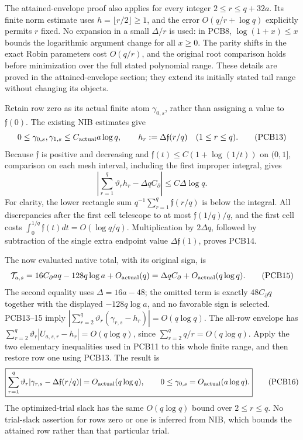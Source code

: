 The attained-envelope proof also applies for every integer
$2\le r\le q+32a$. Its finite norm estimate uses
$h=\lfloor r/2\rfloor\ge1$, and the error $O(q/r+\log q)$ explicitly
permits $r$ fixed. No expansion in a small $\Delta/r$ is used: in PCB8,
$\log(1+x)\le x$ bounds the logarithmic argument change for all $x\ge0$.
The parity shifts in the exact Robin parameters cost $O(q/r)$, and the
original root comparison holds before minimization over the full stated
polynomial range. These details are proved in the attained-envelope
section; they extend its initially stated tail range without changing its
objects.

Retain row zero as its actual finite atom $\gamma_{0,s}$, rather than
assigning a value to $\mathfrak f(0)$. The existing NIB estimates give
\[
 0\le\gamma_{0,s},\gamma_{1,s}
       \le C_{\rm actual}a\log q,
 \qquad h_r:=\Delta\mathfrak f(r/q)\quad(1\le r\le q).
 \tag{PCB13}
\]
Because $\mathfrak f$ is positive and decreasing and
$\mathfrak f(t)\le C(1+\log(1/t))$ on $(0,1]$, comparison on each mesh
interval, including the first improper integral, gives
\[
 \left|\sum_{r=1}^{q}\vartheta_rh_r-\Delta qC_\partial\right|
       \le C\Delta\log q.
 \tag{PCB14}
\]
For clarity, the lower rectangle sum $q^{-1}\sum_{r=1}^q\mathfrak f(r/q)$
is below the integral. All discrepancies after the first cell telescope
to at most $\mathfrak f(1/q)/q$, and the first cell costs
$\int_0^{1/q}\mathfrak f(t)dt=O(\log q/q)$.
Multiplication by $2\Delta q$, followed by subtraction of the single
extra endpoint value $\Delta\mathfrak f(1)$, proves PCB14.

The now evaluated native total, with its original sign, is
\[
 \mathcal T_{a,s}=16C_\partial aq-128q\log a+O_{\rm actual}(q)
       =\Delta qC_\partial+O_{\rm actual}(q\log q).
 \tag{PCB15}
\]
The second equality uses $\Delta=16a-48$; the omitted term is exactly
$48C_\partial q$ together with the displayed $-128q\log a$, and no
favorable sign is selected. PCB13--15 imply
$|\sum_{r=2}^q\vartheta_r(\gamma_{r,s}-h_r)|=O(q\log q)$.
The all-row envelope has
$\sum_{r=2}^q\vartheta_r|U_{a,s,r}-h_r|=O(q\log q)$, since
$\sum_{r=2}^q q/r=O(q\log q)$.
Apply the two elementary inequalities used in PCB11 to this whole finite
range, and then restore row one using PCB13. The result is
\[
 \boxed{\sum_{r=1}^q\vartheta_r
        |\gamma_{r,s}-\Delta\mathfrak f(r/q)|
          =O_{\rm actual}(q\log q),\qquad
 0\le\gamma_{0,s}=O_{\rm actual}(a\log q).}
 \tag{PCB16}
\]
The optimized-trial slack has the same $O(q\log q)$ bound over
$2\le r\le q$. No trial-slack assertion for rows zero or one is inferred
from NIB, which bounds the attained row rather than that particular trial.

